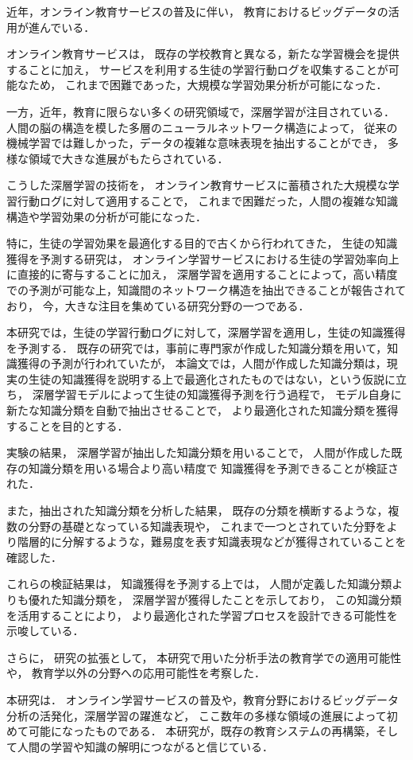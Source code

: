 
近年，オンライン教育サービスの普及に伴い，
教育におけるビッグデータの活用が進んでいる．

オンライン教育サービスは，
既存の学校教育と異なる，新たな学習機会を提供することに加え，
サービスを利用する生徒の学習行動ログを収集することが可能なため，
これまで困難であった，大規模な学習効果分析が可能になった．


一方，近年，教育に限らない多くの研究領域で，深層学習が注目されている．
人間の脳の構造を模した多層のニューラルネットワーク構造によって，
従来の機械学習では難しかった，データの複雑な意味表現を抽出することができ，
多様な領域で大きな進展がもたらされている．

こうした深層学習の技術を，
オンライン教育サービスに蓄積された大規模な学習行動ログに対して適用することで，
これまで困難だった，人間の複雑な知識構造や学習効果の分析が可能になった．

特に，生徒の学習効果を最適化する目的で古くから行われてきた，
生徒の知識獲得を予測する研究は，
オンライン学習サービスにおける生徒の学習効率向上に直接的に寄与することに加え，
深層学習を適用することによって，高い精度での予測が可能な上，知識間のネットワーク構造を抽出できることが報告されており，
今，大きな注目を集めている研究分野の一つである．


本研究では，生徒の学習行動ログに対して，深層学習を適用し，生徒の知識獲得を予測する．
既存の研究では，事前に専門家が作成した知識分類を用いて，知識獲得の予測が行われていたが，
本論文では，人間が作成した知識分類は，現実の生徒の知識獲得を説明する上で最適化されたものではない，という仮説に立ち，
深層学習モデルによって生徒の知識獲得予測を行う過程で，
モデル自身に新たな知識分類を自動で抽出させることで，
より最適化された知識分類を獲得することを目的とする．

実験の結果，
深層学習が抽出した知識分類を用いることで，
人間が作成した既存の知識分類を用いる場合より高い精度で
知識獲得を予測できることが検証された．

また，抽出された知識分類を分析した結果，
既存の分類を横断するような，複数の分野の基礎となっている知識表現や，
これまで一つとされていた分野をより階層的に分解するような，難易度を表す知識表現などが獲得されていることを確認した．

これらの検証結果は，
知識獲得を予測する上では，
人間が定義した知識分類よりも優れた知識分類を，
深層学習が獲得したことを示しており，
この知識分類を活用することにより，
より最適化された学習プロセスを設計できる可能性を示唆している．

さらに，
研究の拡張として，
本研究で用いた分析手法の教育学での適用可能性や，
教育学以外の分野への応用可能性を考察した．


本研究は．
オンライン学習サービスの普及や，教育分野におけるビッグデータ分析の活発化，深層学習の躍進など，
ここ数年の多様な領域の進展によって初めて可能になったものである．
本研究が，既存の教育システムの再構築，そして人間の学習や知識の解明につながると信じている．


